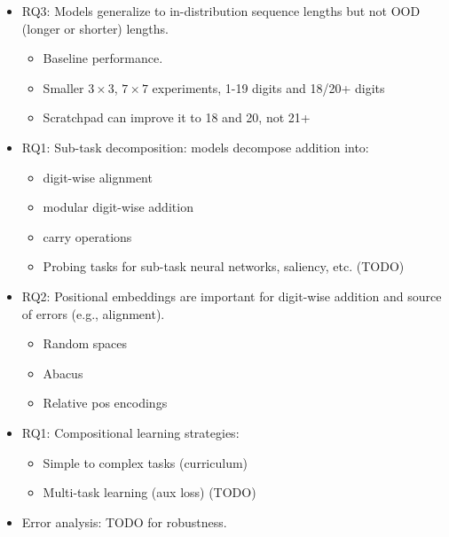 \begin{itemize}
    \item RQ3: Models generalize to in-distribution sequence lengths but not OOD (longer or shorter) lengths.
          \begin{itemize}
              \item Baseline performance.
              \item Smaller $3 \times 3$, $7 \times 7$ experiments, 1-19 digits and 18/20+ digits
              \item Scratchpad can improve it to 18 and 20, not 21+
          \end{itemize}

    \item RQ1: Sub-task decomposition: models decompose addition into:
          \begin{itemize}
              \item digit-wise alignment
              \item modular digit-wise addition
              \item carry operations
              \item Probing tasks for sub-task neural networks, saliency, etc. (TODO)
          \end{itemize}

    \item RQ2: Positional embeddings are important for digit-wise addition and source of errors (e.g., alignment).
          \begin{itemize}
              \item Random spaces
              \item Abacus
              \item Relative pos encodings
          \end{itemize}

    \item RQ1: Compositional learning strategies:
          \begin{itemize}
              \item Simple to complex tasks (curriculum)
              \item Multi-task learning (aux loss) (TODO)
          \end{itemize}

    \item Error analysis: TODO for robustness.

\end{itemize}
